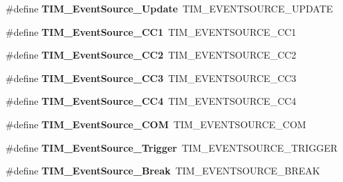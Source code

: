 \begin{DoxyCompactItemize}
\#define {\bfseries T\+I\+M\+\_\+\+Event\+Source\+\_\+\+Update}~T\+I\+M\+\_\+\+E\+V\+E\+N\+T\+S\+O\+U\+R\+C\+E\+\_\+\+U\+P\+D\+A\+TE
\item 
\mbox{\label{group___h_a_l___t_i_m___aliased___defines_gaa634c46d4ac521ad16e25be97b487e8a}} 
\#define {\bfseries T\+I\+M\+\_\+\+Event\+Source\+\_\+\+C\+C1}~T\+I\+M\+\_\+\+E\+V\+E\+N\+T\+S\+O\+U\+R\+C\+E\+\_\+\+C\+C1
\item 
\mbox{\label{group___h_a_l___t_i_m___aliased___defines_ga5e2082a09552acc9c7e9577f104ba15a}} 
\#define {\bfseries T\+I\+M\+\_\+\+Event\+Source\+\_\+\+C\+C2}~T\+I\+M\+\_\+\+E\+V\+E\+N\+T\+S\+O\+U\+R\+C\+E\+\_\+\+C\+C2
\item 
\mbox{\label{group___h_a_l___t_i_m___aliased___defines_gafeb8538e3b00d938e061e5051f83836b}} 
\#define {\bfseries T\+I\+M\+\_\+\+Event\+Source\+\_\+\+C\+C3}~T\+I\+M\+\_\+\+E\+V\+E\+N\+T\+S\+O\+U\+R\+C\+E\+\_\+\+C\+C3
\item 
\mbox{\label{group___h_a_l___t_i_m___aliased___defines_gab60e3190e6c09d2d067f2c689d614979}} 
\#define {\bfseries T\+I\+M\+\_\+\+Event\+Source\+\_\+\+C\+C4}~T\+I\+M\+\_\+\+E\+V\+E\+N\+T\+S\+O\+U\+R\+C\+E\+\_\+\+C\+C4
\item 
\mbox{\label{group___h_a_l___t_i_m___aliased___defines_ga4c06981037fae91786f966aa9b4b3435}} 
\#define {\bfseries T\+I\+M\+\_\+\+Event\+Source\+\_\+\+C\+OM}~T\+I\+M\+\_\+\+E\+V\+E\+N\+T\+S\+O\+U\+R\+C\+E\+\_\+\+C\+OM
\item 
\mbox{\label{group___h_a_l___t_i_m___aliased___defines_ga24835bf5eac25eed90069208dce22564}} 
\#define {\bfseries T\+I\+M\+\_\+\+Event\+Source\+\_\+\+Trigger}~T\+I\+M\+\_\+\+E\+V\+E\+N\+T\+S\+O\+U\+R\+C\+E\+\_\+\+T\+R\+I\+G\+G\+ER
\item 
\mbox{\label{group___h_a_l___t_i_m___aliased___defines_gad6f9b5366d93c73ff005273c50c9f00a}} 
\#define {\bfseries T\+I\+M\+\_\+\+Event\+Source\+\_\+\+Break}~T\+I\+M\+\_\+\+E\+V\+E\+N\+T\+S\+O\+U\+R\+C\+E\+\_\+\+B\+R\+E\+AK

\end{DoxyCompactItemize}
